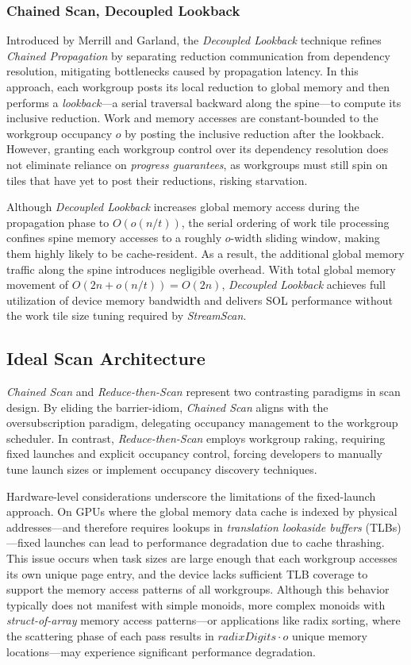 \documentclass[acmsmall, manuscript, screen, review, anonymous]{acmart}
\begin{document}
\subsubsection{Chained Scan, Decoupled Lookback}
Introduced by Merrill and Garland, the \emph{Decoupled Lookback} technique refines \emph{Chained Propagation} by separating reduction communication from dependency resolution, mitigating bottlenecks caused by propagation latency. In this approach, each workgroup posts its local reduction to global memory and then performs a \emph{lookback}---a serial traversal backward along the spine---to compute its inclusive reduction. Work and memory accesses are constant-bounded to the workgroup occupancy $o$ by posting the inclusive reduction after the lookback. However, granting each workgroup control over its dependency resolution does not eliminate reliance on \emph{progress guarantees}, as workgroups must still spin on tiles that have yet to post their reductions, risking starvation.

Although \emph{Decoupled Lookback} increases global memory access during the propagation phase to $O(o(n/t))$, the serial ordering of work tile processing confines spine memory accesses to a roughly $o$-width sliding window, making them highly likely to be cache-resident. As a result, the additional global memory traffic along the spine introduces negligible overhead. With total global memory movement of $O(2n+o(n/t))= O(2n)$, \emph{Decoupled Lookback} achieves full utilization of device memory bandwidth and delivers SOL performance without the work tile size tuning required by \emph{StreamScan}.

\subsection{Ideal Scan Architecture}
\emph{Chained Scan} and \emph{Reduce-then-Scan} represent two contrasting paradigms in scan design. By eliding the barrier-idiom, \emph{Chained Scan} aligns with the oversubscription paradigm, delegating occupancy management to the workgroup scheduler. In contrast, \emph{Reduce-then-Scan} employs workgroup raking, requiring fixed launches and explicit occupancy control, forcing developers to manually tune launch sizes or implement occupancy discovery techniques.

Hardware-level considerations underscore the limitations of the fixed-launch approach. On GPUs where the global memory data cache is indexed by physical addresses---and therefore requires lookups in \emph{translation lookaside buffers} (TLBs)---fixed launches can lead to performance degradation due to cache thrashing. This issue occurs when task sizes are large enough that each workgroup accesses its own unique page entry, and the device lacks sufficient TLB coverage to support the memory access patterns of all workgroups. Although this behavior typically does not manifest with simple monoids, more complex monoids with \emph{struct-of-array} memory access patterns---or applications like radix sorting, where the scattering phase of each pass results in $radixDigits \cdot o$ unique memory locations---may experience significant performance degradation.
\end{document}
